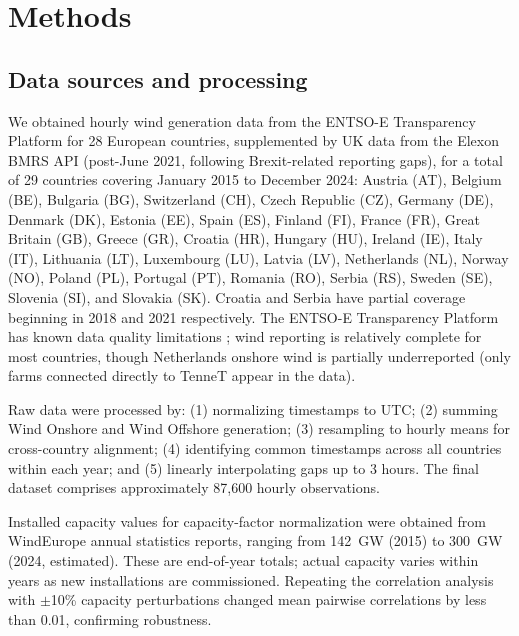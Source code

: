 \documentclass{article}
\begin{document}





\section*{Methods}

\subsection{Data sources and processing}

We obtained hourly wind generation data from the ENTSO-E Transparency Platform for 28 European countries, supplemented by UK data from the Elexon BMRS API (post-June 2021, following Brexit-related reporting gaps), for a total of 29 countries covering January 2015 to December 2024: Austria (AT), Belgium (BE), Bulgaria (BG), Switzerland (CH), Czech Republic (CZ), Germany (DE), Denmark (DK), Estonia (EE), Spain (ES), Finland (FI), France (FR), Great Britain (GB), Greece (GR), Croatia (HR), Hungary (HU), Ireland (IE), Italy (IT), Lithuania (LT), Luxembourg (LU), Latvia (LV), Netherlands (NL), Norway (NO), Poland (PL), Portugal (PT), Romania (RO), Serbia (RS), Sweden (SE), Slovenia (SI), and Slovakia (SK). Croatia and Serbia have partial coverage beginning in 2018 and 2021 respectively. The ENTSO-E Transparency Platform has known data quality limitations \citep{hirth2018}; wind reporting is relatively complete for most countries, though Netherlands onshore wind is partially underreported (only farms connected directly to TenneT appear in the data).

Raw data were processed by: (1) normalizing timestamps to UTC; (2) summing Wind Onshore and Wind Offshore generation; (3) resampling to hourly means for cross-country alignment; (4) identifying common timestamps across all countries within each year; and (5) linearly interpolating gaps up to 3 hours. The final dataset comprises approximately 87,600 hourly observations.

Installed capacity values for capacity-factor normalization were obtained from WindEurope annual statistics reports, ranging from 142~GW (2015) to 300~GW (2024, estimated). These are end-of-year totals; actual capacity varies within years as new installations are commissioned. Repeating the correlation analysis with $\pm$10\% capacity perturbations changed mean pairwise correlations by less than 0.01, confirming robustness.
\end{document}
